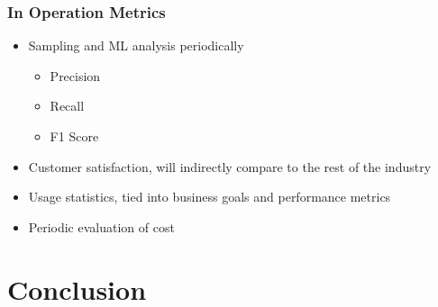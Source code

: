 \documentclass[
	letterpaper, %
	12pt, %
	unnumberedsections, %
	twoside, %
]{LTJournalArticle}
\begin{document}
\subsubsection*{In Operation Metrics}
\begin{itemize}
	\item Sampling and ML analysis periodically
	      \begin{itemize}
		      \item Precision
		      \item Recall
		      \item F1 Score
	      \end{itemize}
	\item Customer satisfaction, will indirectly compare to the rest of the industry
	\item Usage statistics, tied into business goals and performance metrics
	\item Periodic evaluation of cost
\end{itemize}




\section{Conclusion}



\printbibliography %





%
%
%
\end{document}
